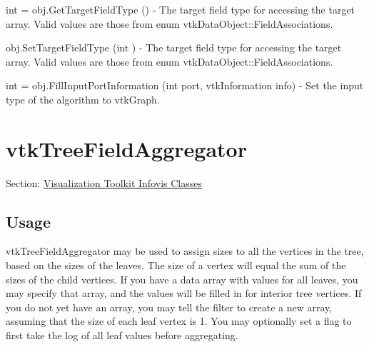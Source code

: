 \begin{DoxyItemize}
\item {\ttfamily int = obj.\-Get\-Target\-Field\-Type ()} -\/ The target field type for accessing the target array. Valid values are those from enum vtk\-Data\-Object\-::\-Field\-Associations.  
\item {\ttfamily obj.\-Set\-Target\-Field\-Type (int )} -\/ The target field type for accessing the target array. Valid values are those from enum vtk\-Data\-Object\-::\-Field\-Associations.  
\item {\ttfamily int = obj.\-Fill\-Input\-Port\-Information (int port, vtk\-Information info)} -\/ Set the input type of the algorithm to vtk\-Graph.  
\end{DoxyItemize}\hypertarget{vtkinfovis_vtktreefieldaggregator}{}\section{vtk\-Tree\-Field\-Aggregator}\label{vtkinfovis_vtktreefieldaggregator}
Section\-: \hyperlink{sec_vtkinfovis}{Visualization Toolkit Infovis Classes} \hypertarget{vtkwidgets_vtkxyplotwidget_Usage}{}\subsection{Usage}\label{vtkwidgets_vtkxyplotwidget_Usage}
vtk\-Tree\-Field\-Aggregator may be used to assign sizes to all the vertices in the tree, based on the sizes of the leaves. The size of a vertex will equal the sum of the sizes of the child vertices. If you have a data array with values for all leaves, you may specify that array, and the values will be filled in for interior tree vertices. If you do not yet have an array, you may tell the filter to create a new array, assuming that the size of each leaf vertex is 1. You may optionally set a flag to first take the log of all leaf values before aggregating.

